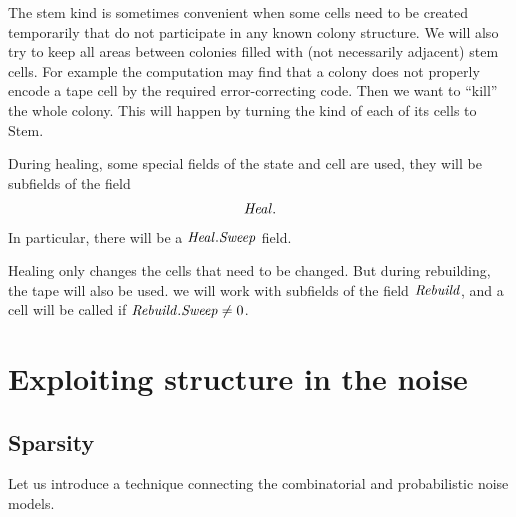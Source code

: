 \documentclass[11pt]{memoir}
\theoremstyle{definition} %
\newcommand{\fld}[1]{\ensuremath{\textit{#1\/}}}
\newcommand{\Addr}{\fld{Addr}}
\newcommand{\cAddr}{\fld{cAddr}}
\newcommand{\Core}{\fld{Core}}
\newcommand{\cCore}{\fld{cCore}}
\newcommand{\Drift}{\fld{Drift}}
\newcommand{\cDrift}{\fld{cDrift}}
\newcommand{\Kind}{\fld{Kind}}
\newcommand{\cKind}{\fld{cKind}}
\newcommand{\Heal}{\fld{Heal}}
\newcommand{\Rebuild}{\fld{Rebuild}}
\newcommand{\Sweep}{\fld{Sweep}}
\newcommand{\cSweep}{\fld{cSw}}
\newcommand{\Stem}{\mathrm{Stem}}
\begin{document}
The stem kind is sometimes convenient when some cells need to be created temporarily
that do not participate in any known colony structure.
We will also try to keep all areas between colonies filled with (not necessarily adjacent)
stem cells.
For example the computation may find that a colony does not properly encode
a tape cell by the required error-correcting code.
Then we want to ``kill'' the whole colony.
This will happen by turning the kind of each of its cells to \( \Stem \).




During healing, some special fields of the state and cell are used, they will be subfields of 
the field
 \begin{align}\label{eq:Heal}
   \Heal.
 \end{align} 
In particular, there will be a \( \Heal.\Sweep \) field.

Healing only changes the cells that need to be changed.
But during rebuilding, the tape will also be used.
we will work with subfields of the field \( \Rebuild \), 
and a cell will be called  if \( \Rebuild.\Sweep\ne 0 \).


\section{Exploiting structure in the noise}\label{sec:noise}

\subsection{Sparsity}\label{sec:sparsity}
Let us introduce a technique connecting the combinatorial and probabilistic
noise models.
\end{document}

